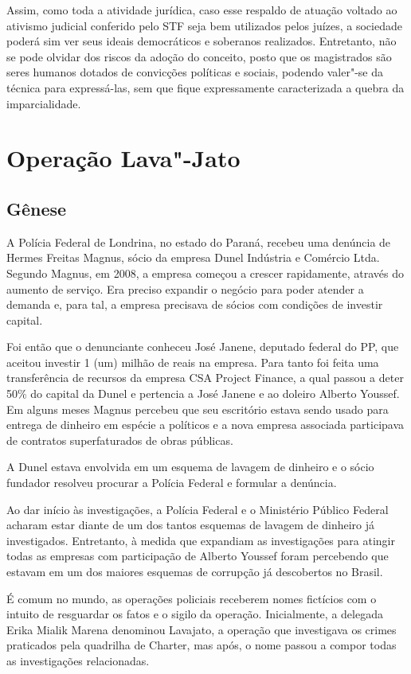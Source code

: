 {Assim, como toda a atividade jurídica, caso esse respaldo de atuação
voltado ao ativismo judicial conferido pelo STF seja bem utilizados
pelos juízes, a sociedade poderá sim ver seus ideais democráticos e
soberanos realizados. Entretanto, não se pode olvidar dos riscos da
adoção do conceito, posto que os magistrados são seres humanos dotados
de convicções políticas e sociais, podendo valer"-se da técnica para
expressá-las, sem que fique expressamente caracterizada a quebra da
imparcialidade.

\section{Operação Lava"-Jato}

\subsection{Gênese}

A Polícia Federal de Londrina, no estado do Paraná, recebeu uma denúncia
de Hermes Freitas Magnus, sócio da empresa Dunel Indústria e Comércio
Ltda. Segundo Magnus, em 2008, a empresa começou a crescer rapidamente,
através do aumento de serviço. Era preciso expandir o negócio para poder
atender a demanda e, para tal, a empresa precisava de sócios com
condições de investir capital.

Foi então que o denunciante conheceu José Janene, deputado federal do
PP, que aceitou investir 1 (um) milhão de reais na empresa. Para tanto
foi feita uma transferência de recursos da empresa CSA Project Finance,
a qual passou a deter 50\% do capital da Dunel e pertencia a José Janene
e ao doleiro Alberto Youssef. Em alguns meses Magnus percebeu que seu
escritório estava sendo usado para entrega de dinheiro em espécie a
políticos e a nova empresa associada participava de contratos
superfaturados de obras públicas.

A Dunel estava envolvida em um esquema de lavagem de dinheiro e o sócio
fundador resolveu procurar a Polícia Federal e formular a denúncia.

Ao dar início às investigações, a Polícia Federal e o Ministério Público
Federal acharam estar diante de um dos tantos esquemas de lavagem de
dinheiro já investigados. Entretanto, à medida que expandiam as
investigações para atingir todas as empresas com participação de Alberto
Youssef foram percebendo que estavam em um dos maiores esquemas de
corrupção já descobertos no Brasil.

É comum no mundo, as operações policiais receberem nomes fictícios com o
intuito de resguardar os fatos e o sigilo da operação. Inicialmente, a
delegada Erika Mialik Marena denominou Lavajato, a operação que
investigava os crimes praticados pela quadrilha de Charter, mas após, o
nome passou a compor todas as investigações relacionadas.

}

